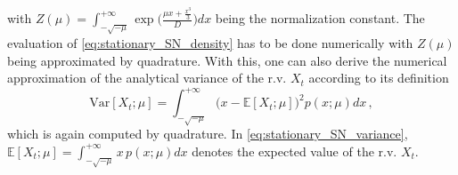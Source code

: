 \documentclass[a4paper,fleqn]{cas-sc}
\begin{document}
%
with $Z(\mu) = \int_{-\sqrt{-\mu}}^{+\infty}\exp\big(\frac{\mu x + \frac{x^{3}}{3}}{D}\big)dx$ being the normalization constant.
The evaluation of \eqref{eq:stationary_SN_density} has to be done numerically with $Z(\mu)$ being approximated by quadrature.
With this, one can also derive the numerical approximation of the analytical variance of the r.v. $X_{t}$ according to its definition
%
\begin{equation}\label{eq:stationary_SN_variance}
        \text{Var}[X_{t};\mu] = \int_{-\sqrt{-\mu}}^{+\infty}\big(x - \mathbb{E}[X_{t};\mu]\big)^{2}p(x;\mu)dx\,,
\end{equation}
%
which is again computed by quadrature.
In \eqref{eq:stationary_SN_variance}, $\mathbb{E}[X_{t};\mu] = \int_{-\sqrt{-\mu}}^{+\infty}x\,p(x;\mu)dx$ denotes the expected value of the r.v. $X_{t}$.
\end{document}
